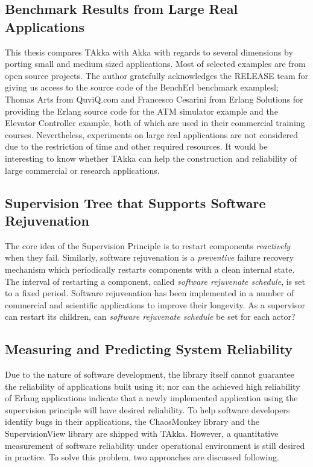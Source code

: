\subsection{Benchmark Results from Large Real Applications}

This thesis compares TAkka with Akka with regards to several dimensions by 
porting small and medium sized applications. Most of selected examples are 
from open source projects. The author gratefully acknowledges the RELEASE team 
for giving us access to the source code of the BenchErl benchmark examplesl; 
Thomas Arts from QuviQ.com and Francesco Cesarini from Erlang Solutions for 
providing the Erlang source code for the ATM simulator example and the Elevator 
Controller example, both of which are used in their commercial training 
courses. Nevertheless, experiments on large real applications are not 
considered due to the restriction of time and other required 
resources. It would be interesting to know whether TAkka can help the 
construction and reliability of large commercial or research applications.



\subsection{Supervision Tree that Supports Software Rejuvenation}

The core idea of the Supervision Principle is to restart components {\it 
reactively} when they fail. Similarly, software rejuvenation 
\citep{huang1995software, dohi2000statistical} is a  {\it preventive} failure 
recovery mechanism which periodically restarts components with a clean internal 
state. The interval of restarting a component, called  {\it software 
rejuvenate schedule}, is set to a fixed period. Software rejuvenation has been 
implemented in a number of commercial and scientific applications to improve 
their longevity. As a supervisor can restart its children, can  {\it software 
rejuvenate schedule} be set for each actor?

\subsection{Measuring and Predicting System Reliability}

Due to the nature of software development, the library itself cannot guarantee 
the reliability of applications built using it; nor can the achieved 
high reliability of Erlang applications indicate that a newly 
implemented application using the supervision principle will have desired 
reliability.   To help software developers identify bugs in their applications, 
the ChaosMonkey library and the SupervisionView library are shipped with TAkka. 
 However, a quantitative measurement of software reliability under operational 
environment is still desired in practice.  To solve this problem, two 
approaches are discussed following.

